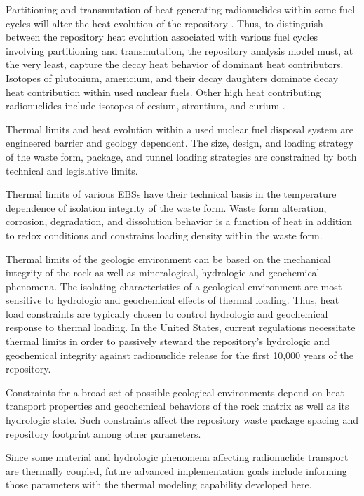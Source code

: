 Partitioning and transmutation of heat generating radionuclides within  some 
fuel cycles will alter the heat evolution of the repository 
\cite{swift_applying_2010}. Thus, to distinguish  between the repository heat 
evolution associated with various fuel cycles involving partitioning and 
transmutation, the repository analysis model must, at the very least, capture 
the decay heat behavior of dominant heat contributors.  Isotopes of plutonium, 
americium, and their decay daughters dominate decay heat contribution within 
used nuclear fuels. Other high heat contributing radionuclides include isotopes 
of cesium, strontium, and curium \cite{piet_which_2007}. 

Thermal limits and heat evolution within a used nuclear fuel disposal system are engineered 
barrier and geology dependent. 
The size, design, and loading strategy of the waste form, package, and tunnel 
loading strategies are constrained by both technical and legislative limits. 

Thermal limits of various \glspl{EBS} have their technical basis in the 
temperature dependence of isolation integrity of the waste form. Waste form 
alteration, corrosion, degradation, and dissolution behavior is a function of heat in 
addition to redox conditions and constrains loading
density within the waste form. 

Thermal limits of the geologic environment can be based on the mechanical 
integrity of the rock as well as mineralogical, hydrologic and geochemical 
phenomena. The isolating characteristics of a geological environment are most 
sensitive to hydrologic 
and geochemical effects of thermal loading. Thus, heat load constraints are 
typically chosen to control hydrologic and geochemical response to thermal 
loading. In the United States, current regulations necessitate thermal limits in 
order to passively steward the repository's hydrologic and geochemical integrity 
against radionuclide  release for the first 10,000 years of the repository.

Constraints for a broad set of possible geological environments 
depend on heat transport properties and geochemical behaviors of the rock matrix 
as well as its hydrologic state.  Such constraints affect the  
repository waste package spacing and repository footprint among 
other parameters. 

Since some 
material and hydrologic phenomena affecting radionuclide transport are 
thermally coupled, future advanced implementation goals include informing those 
parameters with the thermal modeling capability developed here. 

